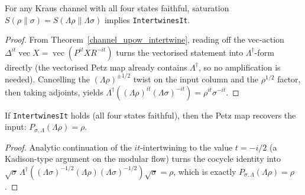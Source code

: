 \begin{theorem}\label{channel_equality_imp_intertwinesIt}
  \leanok
  For any Kraus channel with all four states faithful, saturation
  \(S(\rho\|\sigma)=S(\Lambda\rho\|\Lambda\sigma)\) implies \texttt{IntertwinesIt}.
\end{theorem}
\begin{proof}\leanok
  From Theorem~\ref{channel_upow_intertwine}, reading off the vec-action
  \(\Delta^{it}\operatorname{vec}X=\operatorname{vec}(P^{it}XR^{-it})\) turns the vectorised statement
  into \(\Lambda^{\dagger}\)-form directly (the vectorised Petz map already contains
  \(\Lambda^{\dagger}\), so no amplification is needed). Cancelling the \((\Lambda\rho)^{\pm 1/2}\)
  twist on the input column and the \(\rho^{1/2}\) factor, then taking adjoints, yields
  \(\Lambda^{\dagger}((\Lambda\rho)^{it}(\Lambda\sigma)^{-it})=\rho^{it}\sigma^{-it}\).
\end{proof}

\begin{theorem}\label{intertwinesIt_imp_recovery}
  \leanok
  If \texttt{IntertwinesIt} holds (all four states faithful), then the Petz map recovers the input:
  \(P_{\sigma,\Lambda}(\Lambda\rho)=\rho\).
\end{theorem}
\begin{proof}\leanok
  Analytic continuation of the \(it\)-intertwining to the value \(t=-i/2\) (a Kadison-type argument on
  the modular flow) turns the cocycle identity into
  \(\sqrt{\sigma}\,\Lambda^{\dagger}((\Lambda\sigma)^{-1/2}(\Lambda\rho)(\Lambda\sigma)^{-1/2})\sqrt{\sigma}=\rho\),
  which is exactly \(P_{\sigma,\Lambda}(\Lambda\rho)=\rho\).
\end{proof}


